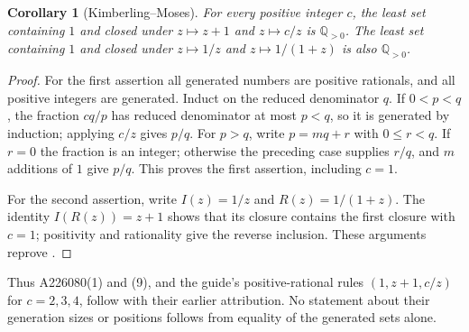 \documentclass[11pt]{article}
\newtheorem{corollary}[theorem]{Corollary}
\newcommand{\Q}{\mathbb{Q}}
\begin{document}
\begin{corollary}[Kimberling--Moses]\label{cor:unary}
For every positive integer $c$, the least set containing $1$ and closed
under $z\mapsto z+1$ and $z\mapsto c/z$ is $\Q_{>0}$.
The least set containing $1$ and closed under $z\mapsto1/z$ and
$z\mapsto1/(1+z)$ is also $\Q_{>0}$.
\end{corollary}
\begin{proof}
For the first assertion all generated numbers are positive rationals,
and all positive integers are generated. Induct on the reduced
denominator $q$. If $0<p<q$, the fraction $cq/p$ has reduced
denominator at most $p<q$, so it is generated by induction;
applying $c/z$ gives $p/q$. For $p>q$, write $p=mq+r$ with
$0\le r<q$. If $r=0$ the fraction is an integer; otherwise the
preceding case supplies $r/q$, and $m$ additions of $1$ give $p/q$.
This proves the first assertion, including $c=1$.

For the second assertion, write $I(z)=1/z$ and $R(z)=1/(1+z)$.
The identity $I(R(z))=z+1$ shows that its closure contains the
first closure with $c=1$; positivity and rationality give the reverse
inclusion. These arguments reprove
\cite[Theorem 3.3 and Example 3.5]{trees}.
\end{proof}

Thus A226080(1) and (9), and the guide's positive-rational rules
$(1,z+1,c/z)$ for $c=2,3,4$, follow with their earlier attribution.
No statement about their generation sizes or positions follows from
equality of the generated sets alone.
\end{document}

